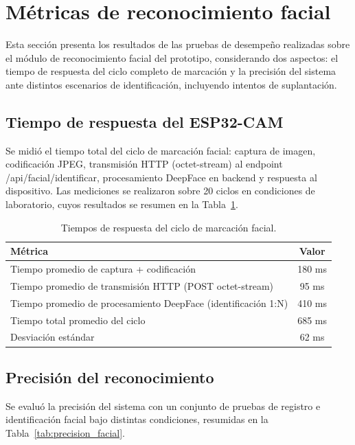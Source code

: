 \documentclass{iccmemoria}
\begin{document}
\section{Métricas de reconocimiento facial}
Esta sección presenta los resultados de las pruebas de desempeño realizadas sobre el módulo de reconocimiento facial del prototipo, considerando dos aspectos: el tiempo de respuesta del ciclo completo de marcación y la precisión del sistema ante distintos escenarios de identificación, incluyendo intentos de suplantación.

\subsection{Tiempo de respuesta del ESP32-CAM}
Se midió el tiempo total del ciclo de marcación facial: captura de imagen, codificación JPEG, transmisión HTTP (octet-stream) al endpoint /api/facial/identificar, procesamiento DeepFace en backend y respuesta al dispositivo. Las mediciones se realizaron sobre 20 ciclos en condiciones de laboratorio, cuyos resultados se resumen en la Tabla~\ref{tab:tiempos_facial}.

\begin{table}[H]
\centering
\begin{tabular}{|l|c|}
\hline
\textbf{Métrica} & \textbf{Valor} \\
\hline
Tiempo promedio de captura + codificación & 180 ms \\
Tiempo promedio de transmisión HTTP (POST octet-stream) & 95 ms \\
Tiempo promedio de procesamiento DeepFace (identificación 1:N) & 410 ms \\
Tiempo total promedio del ciclo & 685 ms \\
Desviación estándar & 62 ms \\
\hline
\end{tabular}
\caption{Tiempos de respuesta del ciclo de marcación facial.}
\label{tab:tiempos_facial}
\end{table}

\subsection{Precisión del reconocimiento}
Se evaluó la precisión del sistema con un conjunto de pruebas de registro e identificación facial bajo distintas condiciones, resumidas en la Tabla~\ref{tab:precision_facial}.
\end{document}

